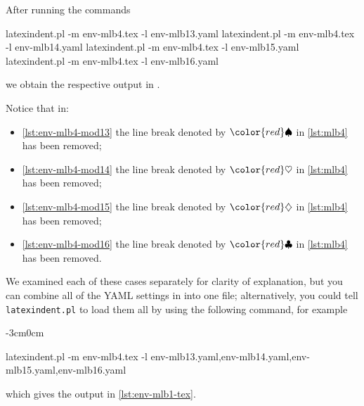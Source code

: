 \documentclass[10pt]{article}
\newenvironment{widepage}{\begin{adjustwidth}{-3cm}{0cm}}{\end{adjustwidth}}
\newcommand{\BeginStartsOnOwnLine}{\color{red}\spadesuit}
\newcommand{\BodyStartsOnOwnLine}{\color{red}\heartsuit}
\newcommand{\EndStartsOnOwnLine}{\color{red}\diamondsuit}
\newcommand{\EndFinishesWithLineBreak}{\color{red}\clubsuit}
\begin{document}
\begin{example}
  After running the commands  

  \begin{commandshell}
latexindent.pl -m env-mlb4.tex -l env-mlb13.yaml
latexindent.pl -m env-mlb4.tex -l env-mlb14.yaml
latexindent.pl -m env-mlb4.tex -l env-mlb15.yaml
latexindent.pl -m env-mlb4.tex -l env-mlb16.yaml
\end{commandshell}

  we obtain the respective output in .

  \begin{cmhtcbraster}
  \end{cmhtcbraster}

  \begin{cmhtcbraster}
  \end{cmhtcbraster}

  Notice that in:
  \begin{itemize}
   \item \cref{lst:env-mlb4-mod13} the line break denoted by $\BeginStartsOnOwnLine$ in
         \cref{lst:mlb4} has been removed;
   \item \cref{lst:env-mlb4-mod14} the line break denoted by $\BodyStartsOnOwnLine$ in
         \cref{lst:mlb4} has been removed;
   \item \cref{lst:env-mlb4-mod15} the line break denoted by $\EndStartsOnOwnLine$ in
         \cref{lst:mlb4} has been removed;
   \item \cref{lst:env-mlb4-mod16} the line break denoted by $\EndFinishesWithLineBreak$ in
         \cref{lst:mlb4} has been removed.
  \end{itemize}
  We examined each of these cases separately for clarity of explanation, but you can
  combine all of the YAML settings in  into one
  file; alternatively, you could tell \texttt{latexindent.pl} to load them all by using
  the following command, for example  
  \begin{widepage}

   \begin{commandshell}
latexindent.pl -m env-mlb4.tex -l env-mlb13.yaml,env-mlb14.yaml,env-mlb15.yaml,env-mlb16.yaml
\end{commandshell}

  \end{widepage}
  which gives the output in \vref{lst:env-mlb1-tex}.
  \end{example}
\end{document}
